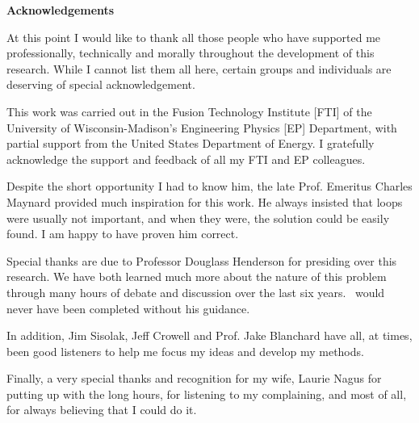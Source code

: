 \vspace*{\fill}

\noindent \textbf{\Huge Acknowledgements}

At this point I would like to thank all those people who have
supported me professionally, technically and morally throughout the
development of this research.  While I cannot list them all here,
certain groups and individuals are deserving of special
acknowledgement.

This work was carried out in the Fusion Technology Institute [FTI] of
the University of Wisconsin-Madison's Engineering Physics [EP]
Department, with partial support from the United States Department of
Energy.  I gratefully acknowledge the support and feedback of all my
FTI and EP colleagues.

Despite the short opportunity I had to know him, the late Prof.
Emeritus Charles Maynard provided much inspiration for this work.  He
always insisted that loops were usually not important, and when they
were, the solution could be easily found.  I am happy to have proven
him correct.

Special thanks are due to Professor Douglass Henderson for presiding
over this research.  We have both learned much more about the nature
of this problem through many hours of debate and discussion over the
last six years.  \ALARA\ would never have been completed without his
guidance.

In addition, Jim Sisolak, Jeff Crowell and Prof. Jake Blanchard have
all, at times, been good listeners to help me focus my ideas and
develop my methods.

Finally, a very special thanks and recognition for my wife, Laurie
Nagus for putting up with the long hours, for listening to my
complaining, and most of all, for always believing that I could do it.






